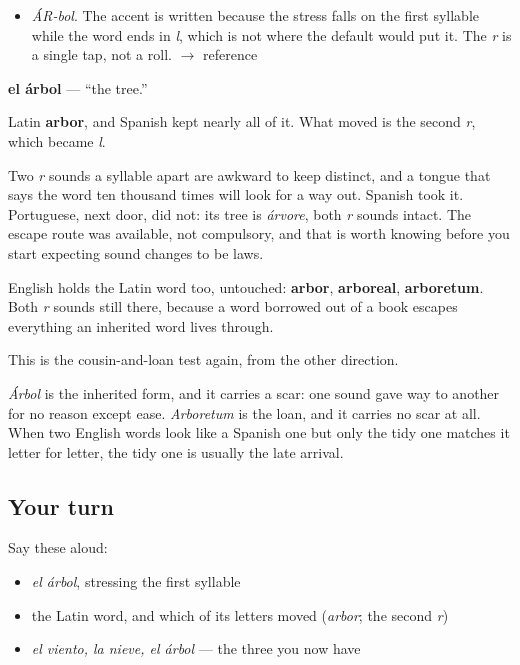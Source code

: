 \begin{sounds}
\begin{itemize}
\raggedright
  \item \emph{ÁR-bol}. The accent is written because the stress falls on the first syllable while the word ends in \emph{l}, which is not where the default would put it. The \emph{r} is a single tap, not a roll. $\to$ reference
\end{itemize}
\end{sounds}

\begin{cousinweb}
\textbf{el árbol} — \textquotedblleft{}the tree.\textquotedblright{}

Latin \textbf{arbor}, and Spanish kept nearly all of it. What moved is the second \emph{r}, which became \emph{l}.

Two \emph{r} sounds a syllable apart are awkward to keep distinct, and a tongue that says the word ten thousand times will look for a way out. Spanish took it. Portuguese, next door, did not: its tree is \emph{árvore}, both \emph{r} sounds intact. The escape route was available, not compulsory, and that is worth knowing before you start expecting sound changes to be laws.

English holds the Latin word too, untouched: \textbf{arbor}, \textbf{arboreal}, \textbf{arboretum}. Both \emph{r} sounds still there, because a word borrowed out of a book escapes everything an inherited word lives through.
\end{cousinweb}

\begin{grammarlens}[title={What you've built}]
This is the cousin-and-loan test again, from the other direction.

\emph{Árbol} is the inherited form, and it carries a scar: one sound gave way to another for no reason except ease. \emph{Arboretum} is the loan, and it carries no scar at all. When two English words look like a Spanish one but only the tidy one matches it letter for letter, the tidy one is usually the late arrival.
\end{grammarlens}

\subsection*{Your turn}
Say these aloud:

\begin{itemize}
\raggedright
  \item \emph{el árbol}, stressing the first syllable
  \item the Latin word, and which of its letters moved (\emph{arbor}; the second \emph{r})
  \item \emph{el viento, la nieve, el árbol} — the three you now have
\end{itemize}

